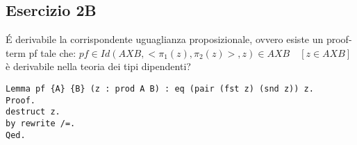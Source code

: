 \subsection{Esercizio 2B}

\'{E} derivabile la corrispondente uguaglianza proposizionale, ovvero esiste un
proof-term pf tale che:
$pf \in Id(A X B, <\pi_1(z), \pi_2(z)>, z ) \in A X B \quad [z \in A X B]$ è
derivabile nella teoria dei tipi dipendenti?

\begin{lstlisting}[language=Coq]
Lemma pf {A} {B} (z : prod A B) : eq (pair (fst z) (snd z)) z.
Proof.
destruct z.
by rewrite /=.
Qed.
\end{lstlisting}
